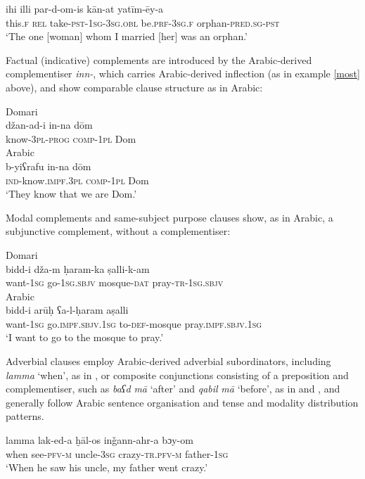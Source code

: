\documentclass[output=paper]{langsci/langscibook}
\begin{document}
\ea \gll   ihi illi par-d-om-is kān-at yatīm-ēy-a\\
       this.\textsc{f} \textsc{rel} take-\textsc{pst-1sg-3sg.obl} be.\textsc{prf-3sg.f} orphan-\textsc{pred.sg-pst}\\
\glt   ‘The one [woman] whom I married [her] was an orphan.’
\z

Factual (indicative) complements are introduced by the Arabic-derived complementiser \textit{inn-}, which carries Arabic-derived inflection (as in example \ref{most} above), and show comparable clause structure as in Arabic:

\ea
\ea
{Domari}\\
\gll džan-ad-i in-na dōm    \\
     know-\textsc{3pl-prog} \textsc{comp}-\textsc{1pl} Dom\\
\ex
{Arabic}\\
\gll b-yiʕrafu in-na dōm  \\
     \textsc{ind}-know.\textsc{impf.3pl} \textsc{comp}-\textsc{1pl} Dom\\
\glt ‘They know that we are Dom.’
\z
\z

Modal complements and same-subject purpose clauses show, as in Arabic, a subjunctive complement, without a complementiser:

\ea
\ea
{Domari}\\
\gll bidd-i  dža-m  ḥaram-ka ṣalli-k-am  \\
       want-\textsc{1sg} go-\textsc{1sg.sbjv} mosque-\textsc{dat} pray-\textsc{tr-1sg.sbjv}\\
\ex
{Arabic}\\
\gll bidd-i  arūḥ ʕa-l-ḥaram aṣalli  \\
       want-\textsc{1sg} go.\textsc{impf.sbjv.1sg} to-\textsc{def-}mosque pray.\textsc{impf.sbjv.1sg} \\
\glt    ‘I want to go to the mosque to pray.’
\z
\z

Adverbial clauses employ Arabic-derived adverbial subordinators, including \textit{lamma} ‘when’, as in , or composite conjunctions consisting of a preposition and complementiser, such as \textit{baʕd} \textit{mā} ‘after’ and \textit{qabil} \textit{mā} ‘before’, as in  and , and generally follow Arabic sentence organisation and tense and modality distribution patterns.

\ea\label{lamma} \gll lamma lak-ed-a ḫāl-os inǧann-ahr-a bɔy-om\\
       when see-\textsc{pfv-m} uncle-\textsc{3sg} crazy-\textsc{tr.pfv-m} father-\textsc{1sg}\\
\glt     ‘When he saw his uncle, my father went crazy.’
\z
\end{document}
